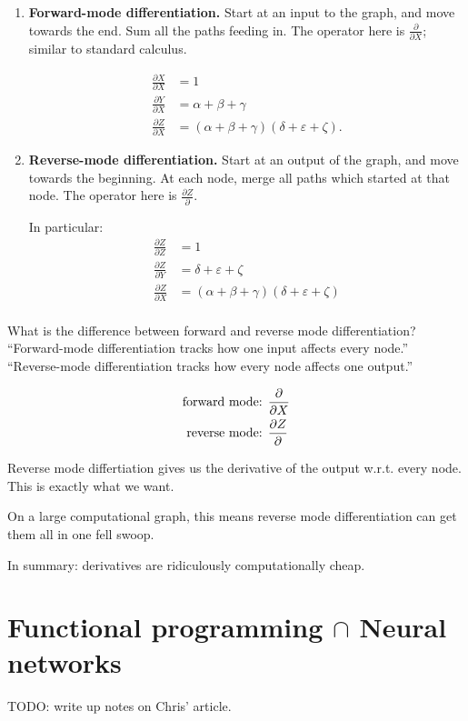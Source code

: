 \begin{enumerate}
  \item {\bf Forward-mode differentiation.} Start at an input to the graph, and move towards the end.  Sum all the paths feeding in.  The operator here is $\frac{\partial}{\partial X}$; similar to standard calculus.

    \begin{align*}
      \frac{\partial X}{\partial X} &= 1 \\
      \frac{\partial Y}{\partial X} &= \alpha + \beta + \gamma \\
      \frac{\partial Z}{\partial X} &= (\alpha + \beta + \gamma)(\delta + \varepsilon +\zeta).
    \end{align*}

  \item {\bf Reverse-mode differentiation.} Start at an output of the graph, and move towards the beginning.  At each node, merge all paths which started at that node.  The operator here is $\frac{\partial Z}{\partial }$.

    In particular:
    \begin{align*}
      \frac{\partial Z}{\partial Z} &= 1 \\
      \frac{\partial Z}{\partial Y} &= \delta + \varepsilon + \zeta  \\
      \frac{\partial Z}{\partial X} &= (\alpha + \beta + \gamma)(\delta + \varepsilon + \zeta) \\
    \end{align*}

\end{enumerate}

What is the difference between forward and reverse mode differentiation?  ``Forward-mode differentiation tracks how one input affects every node.''  ``Reverse-mode differentiation tracks how every node affects one output.''

\begin{align*}
  \text{forward mode: } &\frac{\partial}{\partial X} \\
  \text{reverse mode: } &\frac{\partial Z}{\partial}
\end{align*}

Reverse mode differtiation gives us the derivative of the output w.r.t. every node. This is exactly what we want.

On a large computational graph, this means reverse mode differentiation can get them all in one fell swoop.

In summary: derivatives are ridiculously computationally cheap.

\section{Functional programming $\cap$ Neural networks}

TODO: write up notes on Chris' article.





